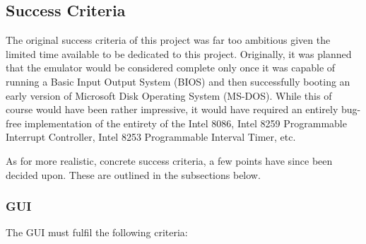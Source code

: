 \subsection{Success Criteria}
    The original success criteria of this project was far too ambitious given the limited time available to be dedicated to this project. Originally, it was planned that the emulator would be considered complete only once it was capable of running a Basic Input Output System (BIOS) and then successfully booting an early version of Microsoft Disk Operating System (MS-DOS). While this of course would have been rather impressive, it would have required an entirely bug-free implementation of the entirety of the Intel 8086, Intel 8259 Programmable Interrupt Controller, Intel 8253 Programmable Interval Timer, etc.

    As for more realistic, concrete success criteria, a few points have since been decided upon. These are outlined in the subsections below.

    \subsubsection{GUI}
        The GUI must fulfil the following criteria:

